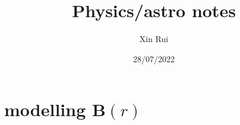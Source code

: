 \documentclass{article}
\title{Physics/astro notes}
\author{Xin Rui}
\date{28/07/2022}
\begin{document}
\maketitle

\section{modelling $\textbf{B}(r)$}
\end{document}
